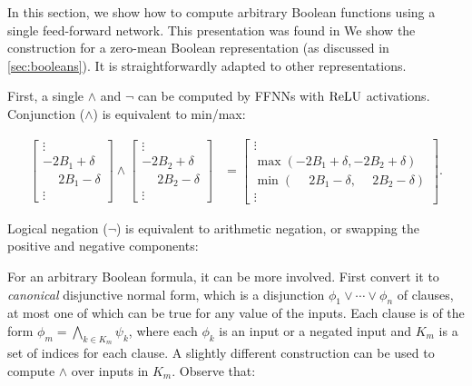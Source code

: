     In this section, we show how to compute arbitrary Boolean functions using a single feed-forward network.
    This presentation was found in \cite{yang2024counting} 
    We show the construction for a zero-mean Boolean representation (as discussed in \cref{sec:booleans}).
    It is straightforwardly adapted to other representations.

    First, a single $\land$ and $\lnot$ can be computed by FFNNs with $\text{ReLU}$ activations. Conjunction ($\land$) is equivalent to min/max:

    \begin{align*}
    \begin{bmatrix} \vdots \\ -2B_1+\delta \\ \phantom{-}2B_1-\delta \\ \vdots \end{bmatrix} \land \begin{bmatrix} \vdots \\ -2B_2+\delta \\ \phantom{-}2B_2-\delta \\ \vdots \end{bmatrix} &= \begin{bmatrix} \vdots \\ \max(-2B_1+\delta,-2B_2+\delta) \\ \min(\phantom{-}2B_1-\delta,\phantom{-}2B_2-\delta) \\ \vdots \end{bmatrix}.
    \end{align*}

    Logical negation ($\lnot$) is equivalent to arithmetic negation, or swapping the positive and negative components:
    \begin{center}
    \end{center}

    For an arbitrary Boolean formula, it can be more involved. First convert it to \emph{canonical} disjunctive normal form, which is a disjunction $\phi_1 \lor \cdots \lor \phi_n$ of clauses, at most one of which can be true for any value of the inputs.
    Each clause is of the form $\phi_m = \bigwedge_{k\in K_m} \psi_k$, where each $\phi_k$ is an input or a negated input and $K_m$ is a set of indices for each clause. A slightly different construction can be used to compute $\land$ over inputs in $K_m$. Observe that:

